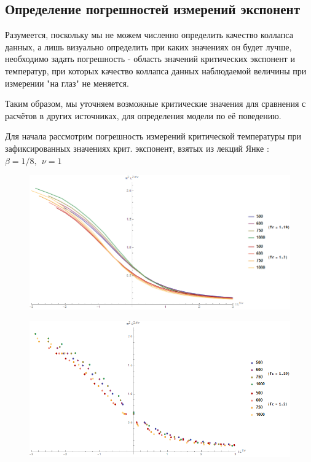 \subsection{Определение погрешностей измерений экспонент}

Разумеется, поскольку мы не можем численно определить качество коллапса данных, а лишь визуально определить при каких значениях он будет лучше, необходимо задать погрешность - область значений критических экспонент и температур, при которых качество коллапса данных наблюдаемой величины при измерении "на глаз" не меняется.

Таким образом, мы уточняем возможные критические значения для сравнения с расчётов в других источниках, для определения модели по её поведению.

Для начала рассмотрим погрешность измерений критической температуры при зафиксированных значениях крит. экспонент, взятых из лекций Янке \cite{Yanke}:
$\beta = 1/8,\ \ \nu = 1$

\begin{figure}[!h]
    \centering
    \includegraphics[width=150mm]{Sections/Images/ErrTc2_1.png}
    \label{fig:ErrTc2_1}
\end{figure}

\begin{figure}[!h]
    \centering
    \includegraphics[width=150mm]{Sections/Images/ErrTc2_2.png}
    \label{fig:ErrTc2_2}
\end{figure}


